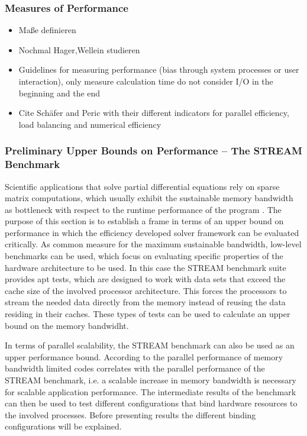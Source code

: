 \subsubsection{Measures of Performance}
\begin{itemize}
\item Maße definieren
\item Nochmal Hager,Wellein studieren
\item Guidelines for measuring performance (bias through system processes or user interaction), only measure calculation time do not consider I/O in the beginning and the end
\item Cite Schäfer and Peric with their different indicators for parallel efficiency, load balancing and numerical efficiency
\end{itemize}

\subsubsection{Preliminary Upper Bounds on Performance -- The STREAM Benchmark}

Scientific applications that solve partial differential equations rely on sparse matrix computations, which usually exhibit the sustainable memory bandwidth as bottleneck with respect to the runtime performance of the program \cite{hager11}. The purpose of this section is to establish a frame in terms of an upper bound on performance in which the efficiency developed solver framework can be evaluated critically. As common measure for the maximum sustainable bandwidth, low-level benchmarks can be used, which focus on evaluating specific properties of the hardware architecture to be used. In this case the STREAM benchmark suite provides apt tests, which are designed to work with data sets that exceed the cache size of the involved processor architecture. This forces the processors to stream the needed data directly from the memory instead of reusing the data residing in their caches. These types of tests can be used to calculate an upper bound on the memory bandwidht.

In terms of parallel scalability, the STREAM benchmark can also be used as an upper performance bound. According to \cite{petsc-web-page} the parallel performance of memory bandwidth limited codes correlates with the parallel performance of the STREAM benchmark, i.e. a scalable increase in memory bandwidth is necessary for scalable application performance. The intermediate results of the benchmark can then be used to test different configurations that bind hardware resources to the involved processes. Before presenting results the different binding configurations will be explained.

